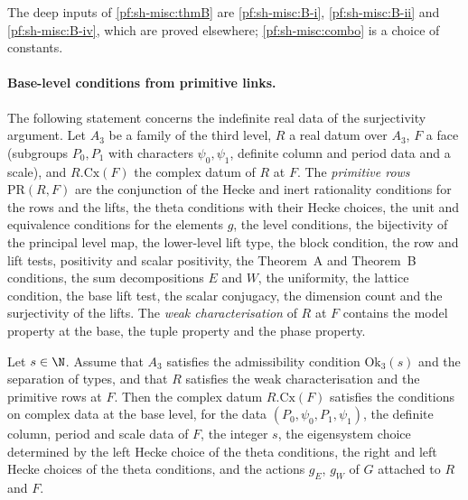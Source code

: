 \begin{remark}\label{pf:sh-misc:thmBrem}
The deep inputs of \cref{pf:sh-misc:thmB} are \ref{pf:sh-misc:B-i}, \ref{pf:sh-misc:B-ii} and \ref{pf:sh-misc:B-iv}, which are proved
elsewhere; \cref{pf:sh-misc:combo} is a choice of constants.
\end{remark}

\paragraph{Base-level conditions from primitive links.}
The following statement concerns the indefinite real data of the surjectivity argument. Let $A_3$ be a family of the
third level, $R$ a real datum over $A_3$, $F$ a face (subgroups $P_0,P_1$ with characters $\psi_0,\psi_1$, definite column and
period data and a scale), and $R.\mathrm{Cx}(F)$ the complex datum of $R$ at $F$. The \emph{primitive rows} $\mathrm{PR}(R,F)$
are the conjunction of the Hecke and inert rationality conditions for the rows and the lifts, the theta conditions with
their Hecke choices, the unit and equivalence conditions for the elements $g$, the level conditions, the bijectivity of
the principal level map, the lower-level lift type, the block condition, the row and lift tests, positivity and scalar
positivity, the Theorem~A and Theorem~B conditions,
the sum decompositions $E$ and $W$, the uniformity, the lattice condition, the base lift test, the scalar conjugacy, the
dimension count and the surjectivity of the lifts. The \emph{weak characterisation} of $R$ at $F$ contains the model
property at the base, the tuple property and the phase property.

\begin{lemma}\label{pf:sh-misc:cdc}
Let $s\in\N$. Assume that $A_3$ satisfies the admissibility condition $\mathrm{Ok}_3(s)$ and the separation of types, and that
$R$ satisfies the weak characterisation and the primitive rows at $F$. Then the complex datum $R.\mathrm{Cx}(F)$ satisfies the
conditions on complex data at the base level, for the data $(P_0,\psi_0,P_1,\psi_1)$, the definite column, period and scale
data of $F$, the integer $s$, the eigensystem choice determined by the left Hecke choice of the theta conditions, the right
and left Hecke choices of the theta conditions, and the actions $g_E$, $g_W$ of $G$ attached to $R$ and $F$.
\end{lemma}

